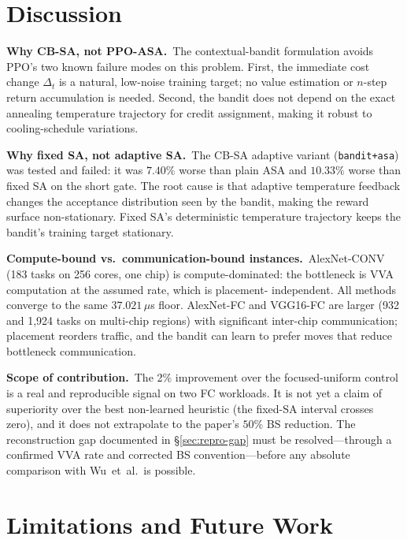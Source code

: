 \documentclass[10pt,conference]{IEEEtran}
\begin{document}
\section{Discussion}
\label{sec:discussion}

\textbf{Why CB-SA, not PPO-ASA.}\
The contextual-bandit formulation avoids PPO's two known failure modes on this
problem.  First, the immediate cost change $\Delta_t$ is a natural, low-noise
training target; no value estimation or $n$-step return accumulation is needed.
Second, the bandit does not depend on the exact annealing temperature trajectory
for credit assignment, making it robust to cooling-schedule variations.

\textbf{Why fixed SA, not adaptive SA.}\
The CB-SA adaptive variant (\texttt{bandit+asa}) was tested and failed: it was
$7.40\%$ worse than plain ASA and $10.33\%$ worse than fixed SA on the short
gate.  The root cause is that adaptive temperature feedback changes the
acceptance distribution seen by the bandit, making the reward surface
non-stationary.  Fixed SA's deterministic temperature trajectory keeps the
bandit's training target stationary.

\textbf{Compute-bound vs.\ communication-bound instances.}\
AlexNet-CONV (183 tasks on 256 cores, one chip) is compute-dominated: the
bottleneck is VVA computation at the assumed rate, which is placement-
independent.  All methods converge to the same $37.021\,\mu$s floor.  AlexNet-FC
and VGG16-FC are larger (932 and 1,924 tasks on multi-chip regions) with
significant inter-chip communication; placement reorders traffic, and the bandit
can learn to prefer moves that reduce bottleneck communication.

\textbf{Scope of contribution.}\
The 2\% improvement over the focused-uniform control is a real and reproducible
signal on two FC workloads.  It is not yet a claim of superiority over the best
non-learned heuristic (the fixed-SA interval crosses zero), and it does not
extrapolate to the paper's $50\%$ BS reduction.  The reconstruction gap documented
in \S\ref{sec:repro-gap} must be resolved---through a confirmed VVA rate and
corrected BS convention---before any absolute comparison with Wu~et~al.\ is
possible.

\section{Limitations and Future Work}
\label{sec:limitations}
\end{document}
